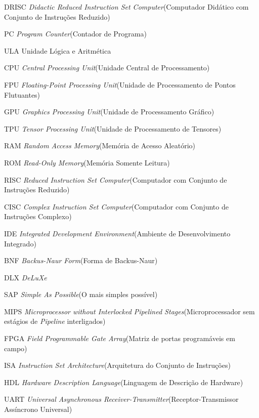 \documentclass[
	12pt,				%
	openright,			%
	oneside,			%
	a4paper,			%
	english,			%
	french,				%
	spanish,			%
	brazil,				%
	]{abntex2}
\begin{document}
\listoftables*
\cleardoublepage
\listofalgorithms
\cleardoublepage
\begin{siglas}
\item[DRISC] \textit{Didactic Reduced Instruction Set Computer}(Computador Didático com Conjunto de Instruções Reduzido)
\item[PC] \textit{Program Counter}(Contador de Programa)
\item[ULA] Unidade Lógica e Aritmética
\item[CPU] \textit{Central Processing Unit}(Unidade Central de Processamento)
\item[FPU] \textit{Floating-Point Processing Unit}(Unidade de Processamento de Pontos Flutuantes)
\item[GPU] \textit{Graphics Processing Unit}(Unidade de Processamento Gráfico)
\item[TPU] \textit{Tensor Processing Unit}(Unidade de Processamento de Tensores)
\item[RAM] \textit{Random Access Memory}(Memória de Acesso Aleatório)
\item[ROM] \textit{Read-Only Memory}(Memória Somente Leitura)
\item[RISC] \textit{Reduced Instruction Set Computer}(Computador com Conjunto de Instruções Reduzido)
\item[CISC] \textit{Complex Instruction Set Computer}(Computador com Conjunto de Instruções Complexo)
\item[IDE] \textit{Integrated Development Environment}(Ambiente de Desenvolvimento Integrado)
\item[BNF] \textit{Backus-Naur Form}(Forma de Backus-Naur)
\item[DLX] \textit{DeLuXe}
\item[SAP] \textit{Simple As Possible}(O mais simples possível)
\item[MIPS] \textit{Microprocessor without Interlocked Pipelined Stages}(Microprocessador sem estágios de \textit{Pipeline} interligados)
\item[FPGA] \textit{Field Programmable Gate Array}(Matriz de portas programáveis em campo)
\item[ISA] \textit{Instruction Set Architecture}(Arquitetura do Conjunto de Instruções)
\item[HDL] \textit{Hardware Description Language}(Linguagem de Descrição de Hardware)
\item[UART] \textit{Universal Asynchronous Receiver-Transmitter}(Receptor-Transmissor Assíncrono Universal)

\end{siglas}
\end{document}
